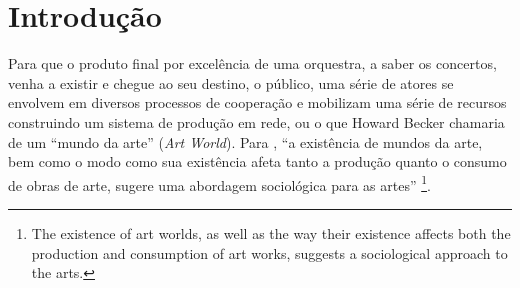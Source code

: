 \documentclass[a4paper, 12pt, openright, oneside, german, french, english, brazil]{abntex2}
\begin{document}
	\listoffigures
	\listoftables	
	\newpage
	\tableofcontents
	\textual
	
	\chapter*[Introdução]{Introdução}
	
	Para que o produto final por excelência de uma orquestra, a saber os concertos, venha a existir e chegue ao seu destino, o público, uma série de atores se envolvem em diversos processos de cooperação e mobilizam uma série de recursos construindo um sistema de produção em rede, ou o que Howard Becker chamaria de um ``mundo da arte'' (\textit{Art World}). Para , ``a existência de mundos da arte, bem como o modo como sua existência afeta tanto a produção quanto o consumo de obras de arte, sugere uma abordagem sociológica para as artes'' \footnote{The existence of art worlds, as well as the way their existence affects both the production and consumption of art works, suggests a sociological approach to the arts.}.
	
	
	
	
	
\end{document}
